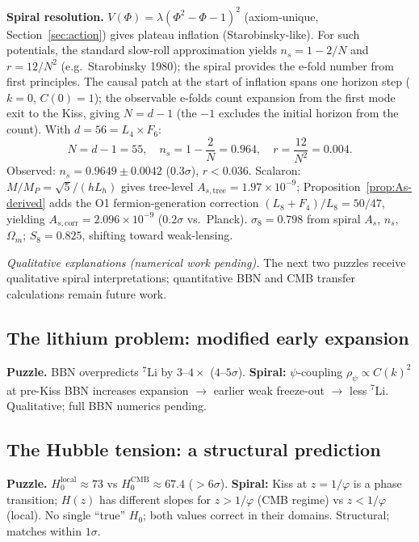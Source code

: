 \documentclass[12pt,a4paper]{article}
\begin{document}
\medskip
\noindent\textbf{Spiral resolution.}\; $V(\Phi) = \lambda(\Phi^2{-}\Phi{-}1)^2$ (axiom-unique, Section~\ref{sec:action}) gives plateau inflation (Starobinsky-like). For such potentials, the standard slow-roll approximation yields $n_s = 1 - 2/N$ and $r = 12/N^2$ (e.g.\ Starobinsky 1980); the spiral provides the e-fold number from first principles. The causal patch at the start of inflation spans one horizon step ($k{=}0$, $C(0){=}1$); the observable e-folds count expansion from the first mode exit to the Kiss, giving $N = d - 1$ (the $-1$ excludes the initial horizon from the count). With $d = 56 = L_4 \times F_6$:
\begin{equation}
N = d - 1 = 55, \quad n_s = 1 - \frac{2}{N} = 0.964, \quad r = \frac{12}{N^2} = 0.004.
\end{equation}
Observed: $n_s = 0.9649 \pm 0.0042$ ($0.3\sigma$), $r < 0.036$. Scalaron: $M/M_P = \sqrt{5}/(h L_h)$ gives tree-level $A_{s,\mathrm{tree}} = 1.97 \times 10^{-9}$; Proposition~\ref{prop:As-derived} adds the O1 fermion-generation correction $(L_8 + F_4)/L_8 = 50/47$, yielding $A_{s,\mathrm{corr}} = 2.096 \times 10^{-9}$ ($0.2\sigma$ vs.\ Planck). $\sigma_8 = 0.798$ from spiral $A_s$, $n_s$, $\Omega_m$; $S_8 = 0.825$, shifting toward weak-lensing.

\medskip\noindent\textit{Qualitative explanations (numerical work pending).} The next two puzzles receive qualitative spiral interpretations; quantitative BBN and CMB transfer calculations remain future work.

\subsection{The lithium problem: modified early expansion}
\label{sec:lithium}

\noindent\textbf{Puzzle.}\; BBN overpredicts ${}^7$Li by $3$--$4\times$ ($4$--$5\sigma$). \textbf{Spiral:} $\psi$-coupling $\rho_\psi \propto C(k)^2$ at pre-Kiss BBN increases expansion $\to$ earlier weak freeze-out $\to$ less ${}^7$Li. Qualitative; full BBN numerics pending.

\subsection{The Hubble tension: a structural prediction}
\label{sec:h0-resolution}

\noindent\textbf{Puzzle.}\; $H_0^{\mathrm{local}} \approx 73$ vs $H_0^{\mathrm{CMB}} \approx 67.4$ ($>6\sigma$). \textbf{Spiral:} Kiss at $z = 1/\varphi$ is a phase transition; $H(z)$ has different slopes for $z > 1/\varphi$ (CMB regime) vs $z < 1/\varphi$ (local). No single ``true'' $H_0$; both values correct in their domains. Structural; matches within $1\sigma$.
\end{document}
